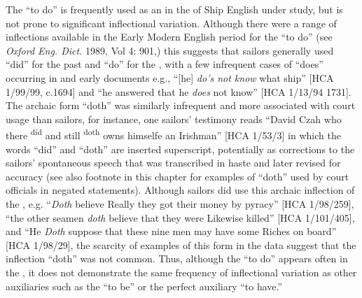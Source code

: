 The  “to do” is frequently used as an  in the  of Ship English under study, but is not prone to significant inflectional variation. Although there were a range of inflections available in the Early Modern English period for the  “to do” (see \textit{Oxford Eng. Dict.} 1989, Vol 4: 901,) this  suggests that sailors generally used “did” for the past and “do” for the , with a few infrequent cases of “does” occurring in  and early  documents e.g., “[he] \textit{do’s not know} what ship” [HCA 1/99/99, c.1694] and “he answered that he \textit{does} not know” [HCA 1/13/94 1731]. The archaic form “doth” was similarly infrequent and more associated with court usage than sailors, for instance, one sailors’ testimony reads “David Czah who there \textsuperscript{did} and still \textsuperscript{doth} owns himselfe an Irishman” [HCA 1/53/3] in which the words “did” and “doth” are inserted superscript, potentially as corrections to the sailors’ spontaneous speech that was transcribed in haste and later revised for accuracy (see also footnote in this chapter for examples of “doth” used by court officials in negated statements). Although sailors did use this archaic inflection of the , e.g. “\textit{Doth} believe Really they got their money by pyracy” [HCA 1/98/259], “the other seamen \textit{doth} believe that they were Likewise killed” [HCA 1/101/405], and “He \textit{Doth} suppose that these nine men may have some Riches on board” [HCA 1/98/29], the scarcity of examples of this form in the data suggest that the inflection “doth” was not common. Thus, although the  “to do” appears often in the , it does not demonstrate the same frequency of inflectional variation as other auxiliaries such as the  “to be” or the perfect auxiliary “to have.” 

